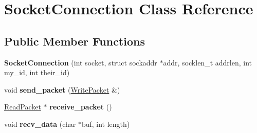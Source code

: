 \hypertarget{class_socket_connection}{\section{Socket\-Connection Class Reference}
\label{class_socket_connection}
}
\subsection*{Public Member Functions}
\begin{DoxyCompactItemize}
\item 
\hypertarget{class_socket_connection_a2a57a69994b4e8638b4fc6c77fcd9c89}{{\bfseries Socket\-Connection} (int socket, struct sockaddr $\ast$addr, socklen\-\_\-t addrlen, int my\-\_\-id, int their\-\_\-id)}\label{class_socket_connection_a2a57a69994b4e8638b4fc6c77fcd9c89}

\item 
\hypertarget{class_socket_connection_a269e4ae2388ddc0e10f6b965b526e51e}{void {\bfseries send\-\_\-packet} (\hyperlink{class_write_packet}{Write\-Packet} \&)}\label{class_socket_connection_a269e4ae2388ddc0e10f6b965b526e51e}

\item 
\hypertarget{class_socket_connection_a6f64271b14de9252968f27d7ec7420a8}{\hyperlink{class_read_packet}{Read\-Packet} $\ast$ {\bfseries receive\-\_\-packet} ()}\label{class_socket_connection_a6f64271b14de9252968f27d7ec7420a8}

\item 
\hypertarget{class_socket_connection_a8f185a6b003b9f94f29ace85ba661676}{void {\bfseries recv\-\_\-data} (char $\ast$buf, int length)}\label{class_socket_connection_a8f185a6b003b9f94f29ace85ba661676}

\end{DoxyCompactItemize}

